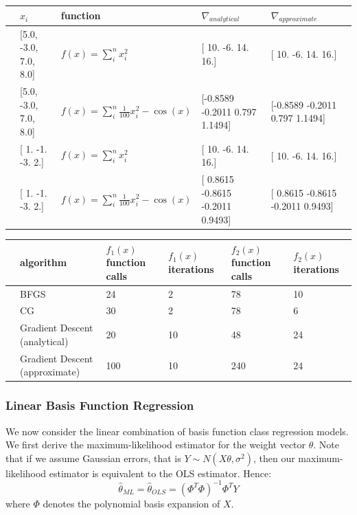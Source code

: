 \documentclass[10pt]{article}
\begin{document}
\begin{table}
\begin{tabular}{llllll}
\toprule
{} &   $x_{i}$  &  function &   $\nabla_{analytical}$  & $\nabla_{approximate}$ \\
\midrule
&    [5.0, -3.0, 7.0, 8.0] & $f(x) = \sum_i^n x_i^2$ &  [ 10.  -6.  14.  16.] & [ 10.  -6.  14.  16.]\\
&    [5.0, -3.0, 7.0, 8.0] & $f(x) = \sum_i^n \frac{1}{100} x_i^2 - \cos(x)$ & [-0.8589 -0.2011  0.797   1.1494] &[-0.8589 -0.2011  0.797   1.1494] \\
&    [ 1. -1. -3.  2.] & $f(x) = \sum_i^n x_i^2$ &  [ 10.  -6.  14.  16.] & [ 10.  -6.  14.  16.]\\
&    [ 1. -1. -3.  2.] & $f(x) = \sum_i^n \frac{1}{100} x_i^2 - \cos(x)$ & [ 0.8615 -0.8615 -0.2011  0.9493] & [ 0.8615 -0.8615 -0.2011  0.9493] \\
\bottomrule
\end{tabular}
\end{table}

\begin{table}
\begin{tabular}{llllll}
\toprule{} & algorithm & $f_1(x)$ function calls & $f_1(x)$ iterations &  $f_2(x)$ function calls &  $f_2(x)$ iterations \\
\midrule
  & BFGS & 24 & 2 & 78 & 10 \\
  & CG & 30 & 2 & 78 & 6 \\
  & Gradient Descent (analytical) & 20 & 10 & 48 & 24 \\ 
  & Gradient Descent (approximate) & 100 & 10 & 240 & 24 \\
\bottomrule
\end{tabular}
\end{table}

\subsubsection*{Linear Basis Function Regression}

We now consider the linear combination of basis function class regression models. We first derive the maximum-likelihood estimator for the weight vector $\theta$. Note that if we assume Gaussian errors, that is $Y \sim N(X\theta, \sigma^2)$, then our maximum-likelihood estimator is equivalent to the OLS estimator. Hence:
\begin{equation*}
	\hat{\theta}_{ML}=\hat{\theta}_{OLS}=(\Phi^T \Phi)^{-1}\Phi^T Y
\end{equation*}
where $\Phi$ denotes the polynomial basis expansion of $X$.
\end{document}
